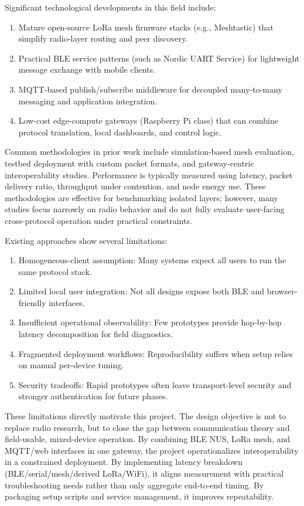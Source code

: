\documentclass[conference]{IEEEtran}
\begin{document}
Significant technological developments in this field include:
\begin{enumerate}
\item Mature open-source LoRa mesh firmware stacks (e.g., Meshtastic) that simplify radio-layer routing and peer discovery.
\item Practical BLE service patterns (such as Nordic UART Service) for lightweight message exchange with mobile clients.
\item MQTT-based publish/subscribe middleware for decoupled many-to-many messaging and application integration.
\item Low-cost edge-compute gateways (Raspberry Pi class) that can combine protocol translation, local dashboards, and control logic.
\end{enumerate}

Common methodologies in prior work include simulation-based mesh evaluation, testbed deployment with custom packet formats, and gateway-centric interoperability studies. Performance is typically measured using latency, packet delivery ratio, throughput under contention, and node energy use. These methodologies are effective for benchmarking isolated layers; however, many studies focus narrowly on radio behavior and do not fully evaluate user-facing cross-protocol operation under practical constraints.

Existing approaches show several limitations:
\begin{enumerate}
\item Homogeneous-client assumption: Many systems expect all users to run the same protocol stack.
\item Limited local user integration: Not all designs expose both BLE and browser-friendly interfaces.
\item Insufficient operational observability: Few prototypes provide hop-by-hop latency decomposition for field diagnostics.
\item Fragmented deployment workflows: Reproducibility suffers when setup relies on manual per-device tuning.
\item Security tradeoffs: Rapid prototypes often leave transport-level security and stronger authentication for future phases.
\end{enumerate}

These limitations directly motivate this project. The design objective is not to replace radio research, but to close the gap between communication theory and field-usable, mixed-device operation. By combining BLE NUS, LoRa mesh, and MQTT/web interfaces in one gateway, the project operationalizes interoperability in a constrained deployment. By implementing latency breakdown (BLE/serial/mesh/derived LoRa/WiFi), it aligns measurement with practical troubleshooting needs rather than only aggregate end-to-end timing. By packaging setup scripts and service management, it improves repeatability.
\end{document}

